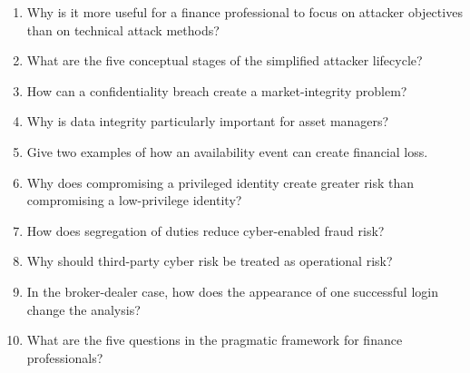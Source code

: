 \begin{enumerate}
    \item Why is it more useful for a finance professional to focus on attacker objectives than on technical attack methods?
    \item What are the five conceptual stages of the simplified attacker lifecycle?
    \item How can a confidentiality breach create a market-integrity problem?
    \item Why is data integrity particularly important for asset managers?
    \item Give two examples of how an availability event can create financial loss.
    \item Why does compromising a privileged identity create greater risk than compromising a low-privilege identity?
    \item How does segregation of duties reduce cyber-enabled fraud risk?
    \item Why should third-party cyber risk be treated as operational risk?
    \item In the broker-dealer case, how does the appearance of one successful login change the analysis?
    \item What are the five questions in the pragmatic framework for finance professionals?
\end{enumerate}
